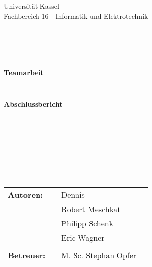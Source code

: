 \documentclass[a4paper,12pt,headsepline,toc=flat]{scrartcl}
\begin{document}
	
	\begin{verbatim}
	
	
	\end{verbatim}
	
	\begin{center}
		\Large{Universität Kassel}\\
		\Large{Fachbereich 16 - Informatik und Elektrotechnik}\\
	\end{center}
	
	
	\begin{verbatim}
	
	
	
	
	\end{verbatim}
	\begin{center}
		\doublespacing
		\textbf{\LARGE{Teamarbeit}}\\
		\singlespacing
		\begin{verbatim}
		
		\end{verbatim}
		\textbf{Abschlussbericht}
	\end{center}
	\begin{verbatim}
	
	\end{verbatim}
	\begin{center}
		
	\end{center}
	\begin{verbatim}
	
	\end{verbatim}
	\begin{center}
		
	\end{center}
	\begin{verbatim}
	
	
	
	
	\end{verbatim}
	\begin{flushleft}
		\begin{tabular}{llll}
			\textbf{Autoren:} & & Dennis & \\
			& & Robert Meschkat & \\
			& & Philipp Schenk & \\
			& & Eric Wagner & \\ \\
			\textbf{Betreuer:} & & M. Sc. Stephan Opfer &\\
		\end{tabular}
	\end{flushleft}
	\newpage
	
\end{document}
